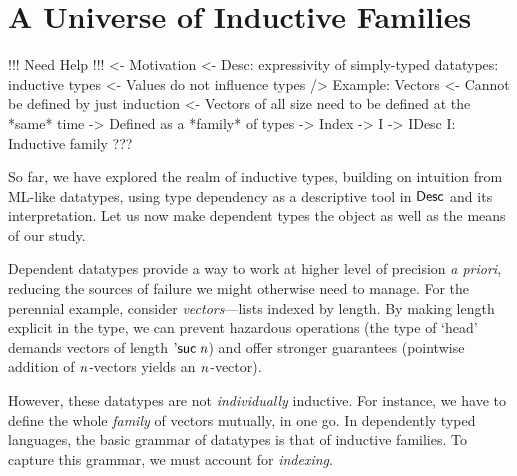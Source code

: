 \section{A Universe of Inductive Families}
\label{sec:indexing-desc}

\newcommand{\vtup}[2]{\bigRedBracket{\begin{array}{@{}#1@{}}#2\end{array}}}

\begin{wstructure}
!!! Need Help !!!
<- Motivation
    <- Desc: expressivity of simply-typed datatypes: inductive types
        <- Values do not influence types
    /> Example: Vectors
        <- Cannot be defined by just induction
            <- Vectors of all size need to be defined at the *same* time
            -> Defined as a *family* of types
                -> Index
        -> I -> IDesc I: Inductive family
    ???
\end{wstructure}

So far, we have explored the realm of inductive types, building on
intuition from ML-like datatypes, using type dependency as a
descriptive tool in $\Desc$ and its interpretation. Let us now make
dependent types the object as well as the means of our study.

Dependent datatypes provide a way to work at higher level of
precision \emph{a priori}, reducing the sources of failure we
might otherwise need to manage. For the perennial
example, consider \emph{vectors}---lists indexed by length. By
making length explicit in the type, we can prevent hazardous
operations (the type of `head' demands vectors of length
$\NatSuc{\V{n}}$) and offer stronger guarantees (pointwise
addition of $\V{n}$-vectors yields an $\V{n}$-vector).

However, these datatypes are not \emph{individually} inductive. For
instance, we have to define the whole \emph{family} of vectors
mutually, in one go. In dependently typed languages, the basic grammar
of datatypes is that of inductive families. To capture this grammar,
we must account for \emph{indexing}.



